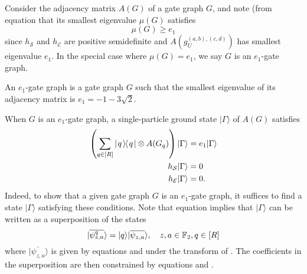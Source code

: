 \documentclass[../thesis-main/thesis-main]{subfiles}
\begin{document}
Consider the adjacency matrix $A(G)$ of a gate graph $G$, and note (from equation  that its smallest eigenvalue $\mu(G)$ satisfies
\begin{equation}
\mu(G)\geq e_{1}
\end{equation}
since $h_{\mathcal{S}}$ and $h_{\mathcal{E}}$ are positive semidefinite and $A(g_{U}^{(a,b),(c,d)})$ has smallest eigenvalue $e_{1}$. In the special case where $\mu(G)=e_{1}$, we say $G$ is an $e_{1}$-gate graph.

\begin{definition}
An $e_{1}$-gate graph is a gate graph $G$ such that the smallest eigenvalue of its adjacency matrix is $e_{1}=-1-3\sqrt{2}$.
\end{definition}

When $G$ is an $e_{1}$-gate graph, a single-particle ground state $|\Gamma\rangle$ of $A(G)$ satisfies 
\begin{align}
\left(\sum_{q\in [R]} |\mspace{2mu} q \mspace{2mu} \rangle\mspace{-2mu}\langle\mspace{2mu} q \mspace{2mu} | \otimes A(G_q)\right)|\Gamma\rangle & =e_{1}|\Gamma\rangle\label{eq:Gamma_disc}\\
h_{\mathcal{S}}|\Gamma\rangle & =0\label{eq:h_s_0}\\
h_{\mathcal{E}}|\Gamma\rangle & =0.\label{eq:h_e_0}
\end{align}
Indeed, to show that a given gate graph $G$ is an $e_{1}$-gate graph, it suffices to find a state $|\Gamma\rangle$ satisfying these conditions. Note that equation  implies that $|\Gamma\rangle$ can be written as a superposition of the states
\begin{equation}
  |\overline{\psi_{z,a}^{q}}\rangle=|q\rangle|\overline{\psi_{z,a}}\rangle,\quad
  z,a\in \mathbb{F}_2, q\in[R]
\end{equation}
where $|\overline{\psi_{z,a}}\rangle$ is given by equations  and  under the transform of . The coefficients in the superposition are then constrained by equations  and .



%
%
\end{document}

